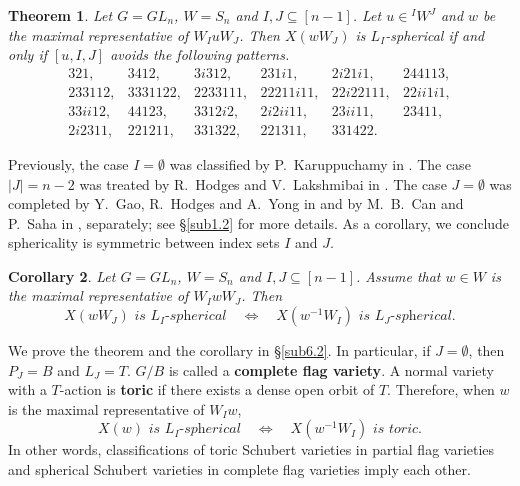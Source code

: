 \documentclass[12pt]{amsart}
\newtheorem{theorem}{Theorem}[section]
\newtheorem{corollary}[theorem]{Corollary}
\theoremstyle{definition}
\theoremstyle{remark}
\begin{document}
\begin{theorem}\label{thm1.2}
Let $G= GL_n$, $W= S_n$ and $I, J \subseteq [n-1]$. Let $u \in {}^I W^J$ and $w$ be the maximal representative of $W_I u W_J$. Then $X(wW_J)$ is $L_I$-spherical if and only if $[u,I,J]$ avoids the following patterns.
\begin{equation}\label{eqn1.7}
\begin{matrix}
321, & 3412, & 3i312, & 231i1, & 2i21i1, & 244113,\\
233112, & 3331122, & 2233111, & 22211i11, & 22i22111, & 22ii1i1, \\
33ii12, & 44123, & 3312i2, & 2i2ii11, & 23ii11, & 23411, \\
2i2311, & 221211, & 331322, & 221311, & 331422.
\end{matrix}
\end{equation}
\end{theorem}

Previously, the case $I= \emptyset$ was classified by P.~Karuppuchamy in \cite{MR3044412}. The case $|J| = n-2$ was treated by R.~Hodges and V.~Lakshmibai in \cite{MR4517644}. The case $J=\emptyset$ was completed by Y.~Gao, R.~Hodges and A.~Yong in \cite{MR4615612} and by M.~B.~Can and P.~Saha in \cite{MR4643501}, separately; see \S \ref{sub1.2} for more details. As a corollary, we conclude sphericality is symmetric between index sets $I$ and $J$.

\begin{corollary}\label{coro1.3}
Let $G= GL_n$, $W= S_n$ and $I,J \subseteq [n-1]$. Assume that $w \in W$ is the maximal representative of $W_I w W_J$. Then
\begin{equation}
\textit{$X(wW_J)$ is $L_I$-spherical} \quad \Leftrightarrow \quad \textit{$X(w^{-1}W_I)$ is $L_J$-spherical}.
\end{equation}
\end{corollary}

We prove the theorem and the corollary in \S \ref{sub6.2}. In particular, if $J = \emptyset$, then $P_J = B$ and $L_J  = T$. $G/B$ is called a \textbf{complete flag variety}. A normal variety with a $T$-action is \textbf{toric} if there exists a dense open orbit of $T$. Therefore, when $w$ is the maximal representative of $W_Iw$,
\begin{equation}
\textit{$X(w)$ is $L_I$-spherical} \quad \Leftrightarrow \quad \textit{$X(w^{-1}W_I)$ is toric}.
\end{equation}
In other words, classifications of toric Schubert varieties in partial flag varieties and spherical Schubert varieties in complete flag varieties imply each other.
\end{document}
